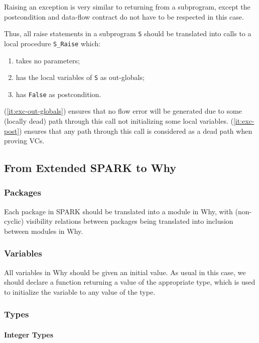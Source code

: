 \documentclass{article}
\begin{document}
Raising an exception is very similar to returning from a subprogram, except the
postcondition and data-flow contract do not have to be respected in this case.

Thus, all raise statements in a subprogram \verb|S| should be translated into
calls to a local procedure \verb|S_Raise| which:
\begin{enumerate}
\item \label{it:exc-no-param} takes no parameters;
\item \label{it:exc-out-globals} has the local variables of \verb|S| as
  out-globals;
\item \label{it:exc-post} has \verb|False| as postcondition.
\end{enumerate}
(\ref{it:exc-out-globals}) ensures that no flow error will be generated due to
some (locally dead) path through this call not initializing some local
variables. (\ref{it:exc-post}) ensures that any path through this call is
considered as a dead path when proving VCs.

\subsection{From Extended SPARK to Why}

\subsubsection{Packages}

Each package in SPARK should be translated into a module in Why, with
(non-cyclic) visibility relations between packages being translated into
inclusion between modules in Why. 

\subsubsection{Variables}

All variables in Why should be given an initial value. As usual in this case,
we should declare a function returning a value of the appropriate type, which
is used to initialize the variable to any value of the type.

\subsubsection{Types}

\paragraph{Integer Types}
\end{document}
